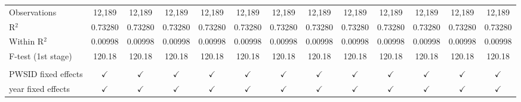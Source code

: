 \begin{table}[htbp]
\begin{adjustbox}{width = \textwidth, center}
\begin{tabular}{lcccccccccccc}
          \\
         Observations                             & 12,189                  & 12,189                 & 12,189                               & 12,189                       & 12,189                        & 12,189                       & 12,189                                     & 12,189                             & 12,189                       & 12,189                      & 12,189                                    & 12,189\\  
         R$^2$                                    & 0.73280                 & 0.73280                & 0.73280                              & 0.73280                      & 0.73280                       & 0.73280                      & 0.73280                                    & 0.73280                            & 0.73280                      & 0.73280                     & 0.73280                                   & 0.73280\\  
         Within R$^2$                             & 0.00998                 & 0.00998                & 0.00998                              & 0.00998                      & 0.00998                       & 0.00998                      & 0.00998                                    & 0.00998                            & 0.00998                      & 0.00998                     & 0.00998                                   & 0.00998\\  
         F-test (1st stage)                       & 120.18                  & 120.18                 & 120.18                               & 120.18                       & 120.18                        & 120.18                       & 120.18                                     & 120.18                             & 120.18                       & 120.18                      & 120.18                                    & 120.18\\  
          \\
         PWSID fixed effects                      & $\checkmark$            & $\checkmark$           & $\checkmark$                         & $\checkmark$                 & $\checkmark$                  & $\checkmark$                 & $\checkmark$                               & $\checkmark$                       & $\checkmark$                 & $\checkmark$                & $\checkmark$                              & $\checkmark$\\   
         year fixed effects                       & $\checkmark$            & $\checkmark$           & $\checkmark$                         & $\checkmark$                 & $\checkmark$                  & $\checkmark$                 & $\checkmark$                               & $\checkmark$                       & $\checkmark$                 & $\checkmark$                & $\checkmark$                              & $\checkmark$\\   
         \bottomrule
      \end{tabular}
   \end{adjustbox}
\end{table}


